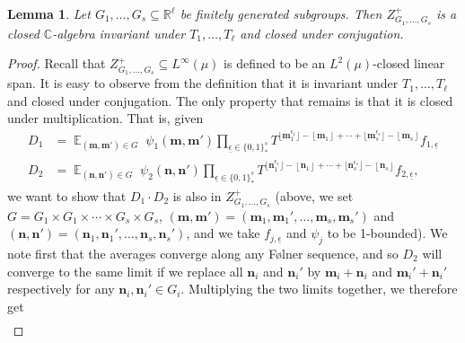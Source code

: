 \documentclass[11pt]{amsart}
\newtheorem{lemma}{Lemma}[section]
\theoremstyle{definition}
\DeclareMathOperator*{\E}{\mathbb{E}}
\newcommand{\C}{{\mathbb C}}
\newcommand{\R}{{\mathbb R}}
\newcommand{\bm}{{\mathbf{m}}}
\newcommand{\bn}{{\mathbf{n}}}
\newcommand{\eps}{\epsilon}
\newcommand{\ueps}{{\underline{\epsilon}}}
\newcommand{\1}{{\mathbf{1}}}
\newcommand{\floor}[1]{{\left \lfloor #1 \right \rfloor}}
\newcommand{\sfloor}[1]{{\lfloor #1 \rfloor}}
\begin{document}
\begin{lemma}\label{L: algebra}
    Let $G_1, \ldots, G_s\subseteq\R^\ell$ be finitely generated subgroups. Then $Z_{G_1, \ldots, G_s}^+$ is a closed $\C$-algebra invariant under $T_1, \ldots, T_\ell$ and closed under conjugation.
\end{lemma}
\begin{proof}
    Recall that $Z_{G_1, \ldots, G_s}^+\subseteq L^\infty(\mu)$ is defined to be an $L^2(\mu)$-closed linear span. It is easy to observe from the definition that it is invariant under $T_1, \ldots, T_\ell$ and closed under conjugation. The only property that remains is that it is closed under multiplication. That is, given
    \begin{align*}
D_1 &=\E_{(\bm, \bm')\in G}\; \psi_1(\bm,\bm')
     \prod_{\ueps\in\{0,1\}^s_*}T^{\sfloor{\bm_1^{\eps_1}}-\floor{\bm_1}+\cdots + \sfloor{\bm_s^{\eps_s}}-\floor{\bm_s}} f_{1,\ueps}\\
    D_2 &=\E_{(\bn, \bn')\in G}\; \psi_2(\bn, \bn')
     \prod_{\ueps\in\{0,1\}^s_*}T^{\sfloor{\bn_1^{\eps_1}}-\floor{\bn_1}+\cdots + \sfloor{\bn_s^{\eps_s}}-\floor{\bn_s}} f_{2,\ueps}, 
    \end{align*}
    we want to show that $D_1\cdot D_2$ is also in $Z_{G_1, \ldots, G_s}^+$ (above, we set $G = G_1\times G_1 \times \cdots \times G_s\times G_s$, $(\bm,\bm') = (\bm_1, \bm_1',\ldots, \bm_s, \bm_s')$ and $(\bn,\bn') = (\bn_1, \bn_1',\ldots, \bn_s, \bn_s')$, and we take $f_{j,\ueps}$ and $\psi_j$ to be 1-bounded).
    We note first that the averages converge along any F\o lner sequence, and so $D_2$ will converge to the same limit if we replace all $\bn_i$ and $\bn_i'$ by $\bm_i+\bn_i$ and $\bm_i'+\bn_i'$ respectively for any $\bn_i,\bn_i'\in G_i$. 
    Multiplying the two limits together, we therefore get
    \begin{multline*}

\end{multline*}
\end{proof}
\end{document}
